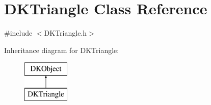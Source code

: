 \hypertarget{class_d_k_triangle}{\section{D\-K\-Triangle Class Reference}
\label{class_d_k_triangle}
}


{\ttfamily \#include $<$D\-K\-Triangle.\-h$>$}

Inheritance diagram for D\-K\-Triangle\-:\begin{figure}[H]
\begin{center}
\leavevmode
\includegraphics[height=2.000000cm]{class_d_k_triangle}
\end{center}
\end{figure}
